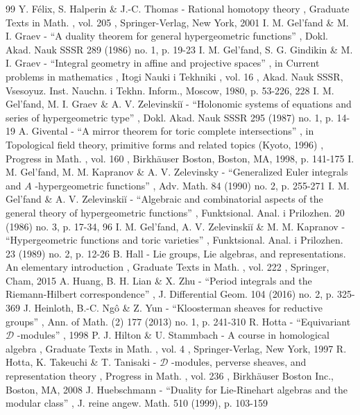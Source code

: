 \documentclass[11pt]{article}
\begin{document}
\begin{thebibliography}{99}
 Y. Félix, S. Halperin \& J.-C. Thomas - Rational homotopy theory , Graduate Texts in Math. , vol. 205 , Springer-Verlag, New York, 2001
 I. M. Gel’fand \& M. I. Graev - “A duality theorem for general hypergeometric functions” , Dokl. Akad. Nauk SSSR 289 (1986) no. 1, p. 19-23
 I. M. Gel’fand, S. G. Gindikin \& M. I. Graev - “Integral geometry in affine and projective spaces” , in Current problems in mathematics , Itogi Nauki i Tekhniki , vol. 16 , Akad. Nauk SSSR, Vsesoyuz. Inst. Nauchn. i Tekhn. Inform., Moscow, 1980, p. 53-226, 228
 I. M. Gel’fand, M. I. Graev \& A. V. Zelevinskiĭ - “Holonomic systems of equations and series of hypergeometric type” , Dokl. Akad. Nauk SSSR 295 (1987) no. 1, p. 14-19
 A. Givental - “A mirror theorem for toric complete intersections” , in Topological field theory, primitive forms and related topics (Kyoto, 1996) , Progress in Math. , vol. 160 , Birkhäuser Boston, Boston, MA, 1998, p. 141-175
 I. M. Gel’fand, M. M. Kapranov \& A. V. Zelevinsky - “Generalized Euler integrals and $A$ -hypergeometric functions” , Adv. Math. 84 (1990) no. 2, p. 255-271
 I. M. Gel’fand \& A. V. Zelevinskiĭ - “Algebraic and combinatorial aspects of the general theory of hypergeometric functions” , Funktsional. Anal. i Prilozhen. 20 (1986) no. 3, p. 17-34, 96
 I. M. Gel’fand, A. V. Zelevinskiĭ \& M. M. Kapranov - “Hypergeometric functions and toric varieties” , Funktsional. Anal. i Prilozhen. 23 (1989) no. 2, p. 12-26
 B. Hall - Lie groups, Lie algebras, and representations. An elementary introduction , Graduate Texts in Math. , vol. 222 , Springer, Cham, 2015
 A. Huang, B. H. Lian \& X. Zhu - “Period integrals and the Riemann-Hilbert correspondence” , J. Differential Geom. 104 (2016) no. 2, p. 325-369
 J. Heinloth, B.-C. Ngô \& Z. Yun - “Kloosterman sheaves for reductive groups” , Ann. of Math. (2) 177 (2013) no. 1, p. 241-310
 R. Hotta - “Equivariant $\mathcal{D}$ -modules” , 1998
 P. J. Hilton \& U. Stammbach - A course in homological algebra , Graduate Texts in Math. , vol. 4 , Springer-Verlag, New York, 1997
 R. Hotta, K. Takeuchi \& T. Tanisaki - $\mathcal{D}$ -modules, perverse sheaves, and representation theory , Progress in Math. , vol. 236 , Birkhäuser Boston Inc., Boston, MA, 2008
 J. Huebschmann - “Duality for Lie-Rinehart algebras and the modular class” , J. reine angew. Math. 510 (1999), p. 103-159

\end{thebibliography}
\end{document}
